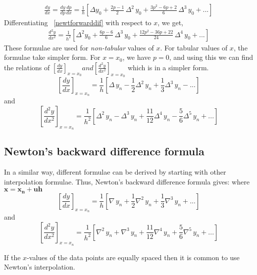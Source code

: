 \documentclass[aima203_lecturenotes_ku.tex]{subfiles}
\begin{document}
\begin{equation}
  \label{newtforwarddif}
  \begin{aligned}
    \frac{dy}{dx} =\frac{dy}{dp} \frac{dp}{dx} = \frac{1}{h} \left [ \Delta y_0 + \frac{2p -1}{2}\, \Delta^2\,  y_0 + \frac{3p^2-6p + 2}{6}\, \Delta^3 \, y_0 + ... \right ]
  \end{aligned}
\end{equation}
Differentiating ~\ref{newtforwarddif} with respect to $x$, we get,
\begin{equation}
  \label{newtforwarddif2}
  \begin{aligned}
    \frac{d^2y}{dx^2} = \frac{1}{h^2} \left [ \Delta^2 y_0 + \frac{6p -6}{6}\, \Delta^3 \,  y_0 + \frac{12p^2-36p + 22}{24}\, \Delta^4 \, y_0 + ... \right ]
  \end{aligned}
\end{equation}
These formulae are used for \textit{non-tabular} values of $x$. For tabular values of $x$, the formulae take simpler form. For $x=x_0$, we have $p=0$, and using this we can find the relations of $\displaystyle \left [ \frac{dy}{dx} \right ]  _{x=x_0} and \left [\frac{d^2y}{dx^2} \right ] _{x=x_0}$ which is in a simpler form.
\newpage
\begin{equation}
  \label{newtforw1x}
  \left [ \frac{dy}{dx} \right ] _{x=x_n} = \frac{1}{h} \left [\Delta \, y_n - \frac{1}{2} \Delta ^2 \, y_n + \frac{1}{3} \Delta ^3 \, y_n - ... \right ]
\end{equation}
and
\begin{equation}
  \label{newtforw2x}
  \left [ \frac{d^2y}{dx^2} \right ] _{x=x_n} = \frac{1}{h^2} \left [\Delta^2 \, y_n - \Delta ^3 \, y_n + \frac{11}{12} \Delta ^4 \, y_n - \frac{5}{6} \Delta ^5 \, y_n + ... \right ]
\end{equation}

\subsection{Newton's backward difference formula}
In a similar way, different formulae can be derived by starting with other interpolation formulae. Thus, Newton's backward difference formula gives: where $\mathbf{x = x_n + uh}$
\begin{equation}
  \label{newtbackwarddif}
  \left [ \frac{dy}{dx} \right ] _{x=x_n} = \frac{1}{h} \left [\nabla \, y_n + \frac{1}{2} \nabla ^2 \, y_n + \frac{1}{3} \nabla ^3 \, y_n + ... \right ]
\end{equation}
and
\begin{equation}
  \label{newtbackwarddif2}
  \left [ \frac{d^2y}{dx^2} \right ] _{x=x_n} = \frac{1}{h^2} \left [\nabla^2 \, y_n + \nabla ^3 \, y_n + \frac{11}{12} \nabla ^4 \, y_n + \frac{5}{6} \nabla ^5 \, y_n + ... \right ]
\end{equation}
\begin{remark}
   If the $x$-values of the data points are equally spaced then it is common to use Newton's interpolation.
\end{remark}
\end{document}
